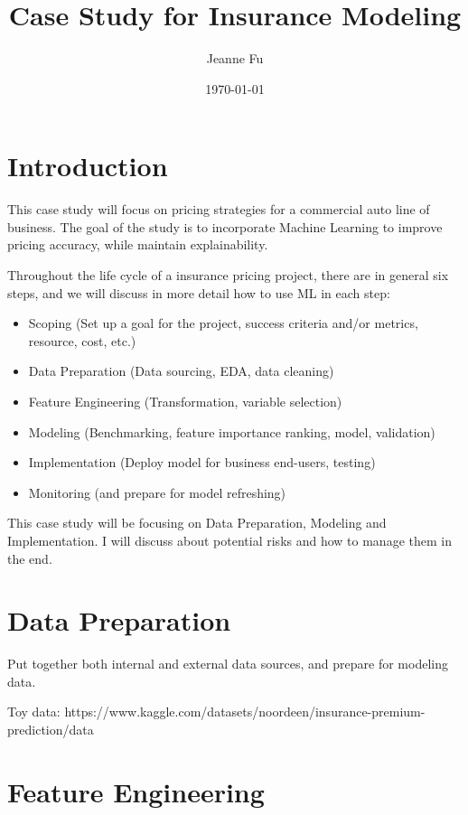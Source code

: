 \documentclass{article}
\title{Case Study for Insurance Modeling}
\author{Jeanne Fu}
\date{\today}
\begin{document}
\maketitle

\section{Introduction}
This case study will focus on pricing strategies for a commercial auto line of business. The goal of the study is to incorporate Machine Learning to improve pricing accuracy, while maintain explainability.

Throughout the life cycle of a insurance pricing project, there are in general six steps, and we will discuss in more detail how to use ML in each step:

\begin{itemize}
    \item Scoping (Set up a goal for the project, success criteria and/or metrics, resource, cost, etc.)
    \item Data Preparation (Data sourcing, EDA, data cleaning)
    \item Feature Engineering (Transformation, variable selection)
    \item Modeling (Benchmarking, feature importance ranking, model, validation)
    \item Implementation (Deploy model for business end-users, testing)
    \item Monitoring (and prepare for model refreshing)
\end{itemize}

This case study will be focusing on Data Preparation, Modeling and Implementation. I will discuss about potential risks and how to manage them in the end.

\section{Data Preparation}
Put together both internal and external data sources, and prepare for modeling data.

Toy data:
https://www.kaggle.com/datasets/noordeen/insurance-premium-prediction/data

\section{Feature Engineering}
\end{document}
